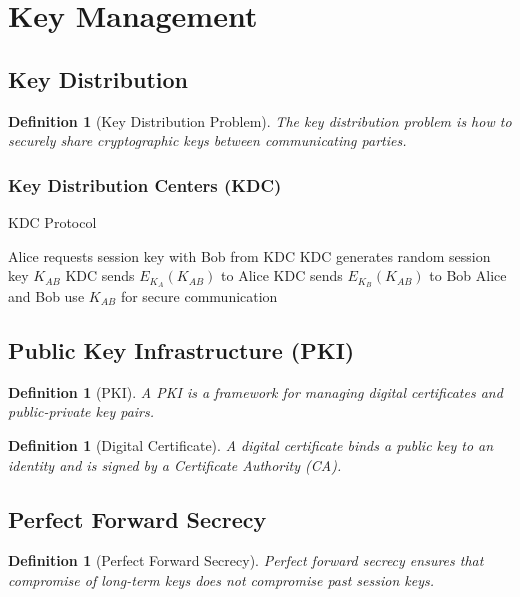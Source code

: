 \documentclass[11pt,a4paper]{article}
\newtheorem{definition}[theorem]{Definition}
\begin{document}
\section{Key Management}

\subsection{Key Distribution}

\begin{definition}[Key Distribution Problem]
The key distribution problem is how to securely share cryptographic keys between communicating parties.
\end{definition}

\subsubsection{Key Distribution Centers (KDC)}

\begin{algorithm}
\caption{KDC Protocol}
\begin{algorithmic}[1]
\STATE Alice requests session key with Bob from KDC
\STATE KDC generates random session key $K_{AB}$
\STATE KDC sends $E_{K_A}(K_{AB})$ to Alice
\STATE KDC sends $E_{K_B}(K_{AB})$ to Bob
\STATE Alice and Bob use $K_{AB}$ for secure communication
\end{algorithmic}
\end{algorithm}

\subsection{Public Key Infrastructure (PKI)}

\begin{definition}[PKI]
A PKI is a framework for managing digital certificates and public-private key pairs.
\end{definition}

\begin{definition}[Digital Certificate]
A digital certificate binds a public key to an identity and is signed by a Certificate Authority (CA).
\end{definition}

\subsection{Perfect Forward Secrecy}

\begin{definition}[Perfect Forward Secrecy]
Perfect forward secrecy ensures that compromise of long-term keys does not compromise past session keys.
\end{definition}
\end{document}
